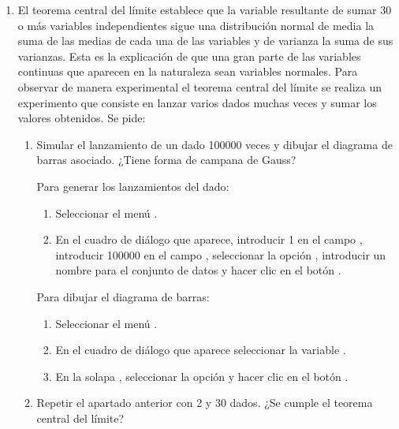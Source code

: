 \begin{enumerate}[leftmargin=*]
\item El teorema central del límite establece que la variable resultante de sumar 30 o más variables independientes
sigue una distribución normal de media la suma de las medias de cada una de las variables y de varianza la suma de sus
varianzas.
Esta es la explicación de que una gran parte de las variables continuas que aparecen en la naturaleza sean variables
normales.
Para observar de manera experimental el teorema central del límite se realiza un experimento que consiste en lanzar
varios dados muchas veces y sumar los valores obtenidos. 
Se pide:
\begin{enumerate}
\item Simular el lanzamiento de un dado 100000 veces y dibujar el diagrama de barras asociado. 
¿Tiene forma de campana de Gauss?
\begin{indicacion}{Para generar los lanzamientos del dado: 
\begin{enumerate}
\item Seleccionar el menú .
\item En el cuadro de diálogo que aparece, introducir 1 en el campo , introducir 100000 en el
campo , seleccionar la opción , introducir un nombre para el conjunto
de datos y hacer clic en el botón .
\end{enumerate}
Para dibujar el diagrama de barras:
\begin{enumerate}
\item Seleccionar el menú .
\item En el cuadro de diálogo que aparece seleccionar la variable .
\item En la solapa , seleccionar la opción  y hacer clic en
el botón .
\end{enumerate}}
\end{indicacion}

\item Repetir el apartado anterior con 2 y 30 dados. 
¿Se cumple el teorema central del límite?
\end{enumerate}



\end{enumerate}
